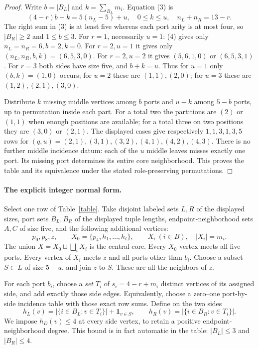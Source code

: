 \documentclass[11pt]{article}
\begin{document}
\begin{proof}
Write $b=|B_L|$ and $k=\sum_{B_L}m_i$. Equation (3) is
\[
 (4-r)b+k=5(n_L-5)+u,\quad 0\leq k\leq u,\quad
 n_L+n_R=13-r.                                    \tag{4}
\]
The right sum in (3) is at least five whereas each port arity is
at most four, so $|B_R|\geq2$ and $1\leq b\leq3$.
For $r=1$, necessarily $u=1$: (4) gives only $n_L=n_R=6,b=2,k=0$.
For $r=2,u=1$ it gives only $(n_L,n_R,b,k)=(6,5,3,0)$.
For $r=2,u=2$ it gives $(5,6,1,0)$ or $(6,5,3,1)$.
For $r=3$ both sides have size five, and $b+k=u$.
Thus for $u=1$ only $(b,k)=(1,0)$ occurs; for $u=2$ these
are $(1,1),(2,0)$; for $u=3$ these are $(1,2),(2,1),(3,0)$.

Distribute $k$ missing middle vertices among $b$ ports and $u-k$
among $5-b$ ports, up to permutation inside each part. For a total
two the partitions are $(2)$ or $(1,1)$ when enough positions are
available; for a total three on two positions they are $(3,0)$
or $(2,1)$. The displayed cases give respectively $1,1,3,1,3,5$
rows for $(q,u)=(2,1),(3,1),(3,2),(4,1),(4,2),(4,3)$.
There is no further middle incidence datum: each of the $u$ middle
leaves misses exactly one port. Its missing port determines its
entire core neighborhood. This proves the table and its equivalence
under the stated role-preserving permutations.
\end{proof}

\paragraph{The explicit integer normal form.}
Select one row of Table~\ref{table}. Take disjoint labeled sets
$L,R$ of the displayed sizes, port sets $B_L,B_R$ of the displayed
tuple lengths, endpoint-neighborhood sets $A,C$ of size five,
and the following additional vertices:
\[
 p_0,p_8,z,\qquad X_0=\{p_4,h_1,\ldots,h_t\},\qquad
 X_i\ (i\in B),\quad |X_i|=m_i.
\]
The union $X=X_0\sqcup\bigsqcup_iX_i$ is the central core.
Every $X_0$ vertex meets all five ports. Every vertex of $X_i$
meets $z$ and all ports other than $b_i$. Choose a subset
$S\subset L$ of size $5-u$, and join $z$ to $S$. These are all
the neighbors of $z$.

For each port $b_i$, choose a \emph{set} $T_i$ of $s_i=4-r+m_i$
distinct vertices of its assigned side, and add exactly those side
edges. Equivalently, choose a zero--one port-by-side incidence table
with those exact row sums. Define on the two sides
\[
 h_L(v)=|\{i\in B_L:v\in T_i\}|+\mathbf1_{v\in S},\qquad
 h_R(v)=|\{i\in B_R:v\in T_i\}|.                   \tag{5}
\]
We impose $h_D(v)\leq4$ at every side vertex, to retain a positive
endpoint-neighborhood degree. This bound is in fact automatic in
the table: $|B_L|\leq3$ and $|B_R|\leq4$.
\end{document}
